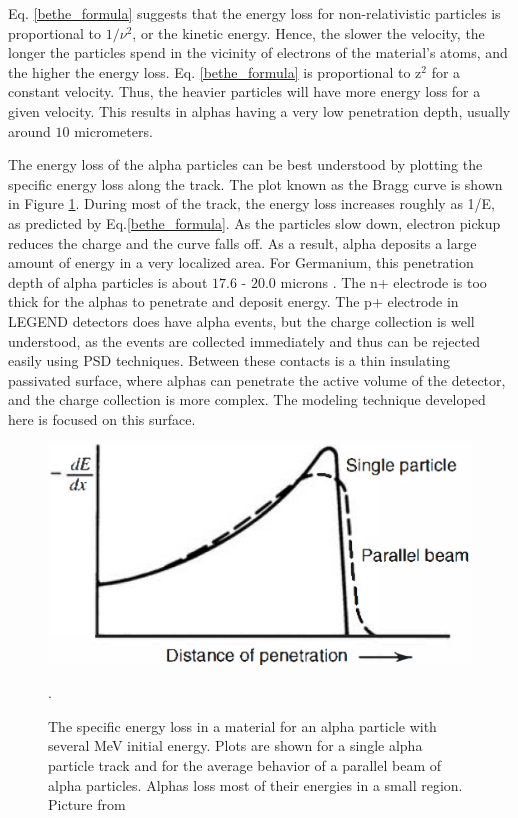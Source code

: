 Eq. \ref{bethe_formula} suggests that the energy loss for non-relativistic particles is proportional to $1/\nu^2$, or the kinetic energy. Hence, the slower the velocity, the longer the particles spend in the vicinity of electrons of the material's atoms, and the higher the energy loss. Eq. \ref{bethe_formula} is proportional to z$^2$ for a constant velocity. Thus, the heavier particles will have more energy loss for a given velocity. This results in alphas having a very low penetration depth, usually around $10$ micrometers.

The energy loss of the alpha particles can be best understood by plotting the specific energy loss along the track. The plot known as the Bragg curve is shown in Figure \ref{bragg_curve_fig}. During most of the track, the energy loss increases roughly as 1/E, as predicted by Eq.\ref{bethe_formula}. As the particles slow down, electron pickup reduces the charge and the curve falls off. As a result, alpha deposits a large amount of energy in a very localized area. For Germanium, this penetration depth of alpha particles is about $17.6$ - $20.0$ microns \cite{knoll_2010}. The n+ electrode is too thick for the alphas to penetrate and deposit energy. The p+ electrode in LEGEND detectors does have alpha events, but the charge collection is well understood, as the events are collected immediately and thus can be rejected easily using PSD techniques. Between these contacts is a thin insulating passivated surface, where alphas can penetrate the active volume of the detector, and the charge collection is more complex. The modeling technique developed here is focused on this surface.

\begin{figure}
\centering
\includegraphics[width=0.5\linewidth]{ch3/figs/bragg_curve.png}
\caption{The specific energy loss in a material for an alpha particle with several MeV initial energy. Plots are shown for a single alpha particle track and for the average behavior of a parallel beam of alpha particles. Alphas loss most of their energies in a small region. Picture from \cite{knoll_2010}}. 
\label{bragg_curve_fig}
\end{figure}

